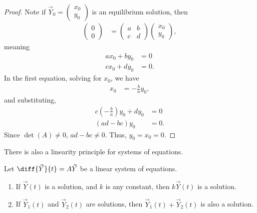 \documentclass[10pt]{mypackage}
\begin{document}
\begin{proof}
  Note if $\vec{Y}_0 = \begin{pmatrix}x_0\\y_0\end{pmatrix}$ is an equilibrium solution, then
  \begin{align*}
    \begin{pmatrix}0\\0\end{pmatrix} &= \begin{pmatrix}a & b \\ c & d\end{pmatrix} \begin{pmatrix}x_0\\y_0\end{pmatrix},
  \end{align*}
  meaning
  \begin{align*}
    ax_0 + by_0 &= 0\\
    cx_0 + dy_0 &= 0.
  \end{align*}
  In the first equation, solving for $x_0$, we have
  \begin{align*}
    x_0 &= -\frac{b}{a}y_0,
  \end{align*}
  and substituting,
  \begin{align*}
    c\left(-\frac{b}{a}\right)y_0 + dy_0 &= 0\\
    \left(ad-bc\right)y_0 &= 0.
  \end{align*}
  Since $\det(A)\neq 0$, $ad-bc\neq 0$. Thus, $y_0 = x_0 = 0$.
\end{proof}
There is also a linearity principle for systems of equations.
\begin{theorem}
  Let $\diff{\vec{Y}}{t} = A\vec{Y}$ be a linear system of equations.
  \begin{enumerate}[(1)]
    \item If $\vec{Y}(t)$ is a solution, and $k$ is any constant, then $k\vec{Y}(t)$ is a solution.
    \item If $\vec{Y}_1(t)$ and $\vec{Y}_2(t)$ are solutions, then $\vec{Y}_1(t)+ \vec{Y}_2(t)$ is also a solution.
  \end{enumerate}
\end{theorem}
\end{document}
